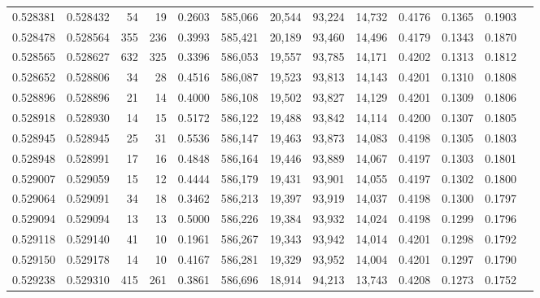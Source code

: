 \begin{tabular}{rrrrrrrrrrrrr}
0.528381 & 0.528432 &    54 &    19 &                                     0.2603 & 585,066 &  20,544 &  93,224 &  14,732 & 0.4176 & 0.1365 & 0.1903 \\
0.528478 & 0.528564 &   355 &   236 &                                     0.3993 & 585,421 &  20,189 &  93,460 &  14,496 & 0.4179 & 0.1343 & 0.1870 \\
0.528565 & 0.528627 &   632 &   325 &                                     0.3396 & 586,053 &  19,557 &  93,785 &  14,171 & 0.4202 & 0.1313 & 0.1812 \\
0.528652 & 0.528806 &    34 &    28 &                                     0.4516 & 586,087 &  19,523 &  93,813 &  14,143 & 0.4201 & 0.1310 & 0.1808 \\
0.528896 & 0.528896 &    21 &    14 &                                     0.4000 & 586,108 &  19,502 &  93,827 &  14,129 & 0.4201 & 0.1309 & 0.1806 \\
0.528918 & 0.528930 &    14 &    15 &                                     0.5172 & 586,122 &  19,488 &  93,842 &  14,114 & 0.4200 & 0.1307 & 0.1805 \\
0.528945 & 0.528945 &    25 &    31 &                                     0.5536 & 586,147 &  19,463 &  93,873 &  14,083 & 0.4198 & 0.1305 & 0.1803 \\
0.528948 & 0.528991 &    17 &    16 &                                     0.4848 & 586,164 &  19,446 &  93,889 &  14,067 & 0.4197 & 0.1303 & 0.1801 \\
0.529007 & 0.529059 &    15 &    12 &                                     0.4444 & 586,179 &  19,431 &  93,901 &  14,055 & 0.4197 & 0.1302 & 0.1800 \\
0.529064 & 0.529091 &    34 &    18 &                                     0.3462 & 586,213 &  19,397 &  93,919 &  14,037 & 0.4198 & 0.1300 & 0.1797 \\
0.529094 & 0.529094 &    13 &    13 &                                     0.5000 & 586,226 &  19,384 &  93,932 &  14,024 & 0.4198 & 0.1299 & 0.1796 \\
0.529118 & 0.529140 &    41 &    10 &                                     0.1961 & 586,267 &  19,343 &  93,942 &  14,014 & 0.4201 & 0.1298 & 0.1792 \\
0.529150 & 0.529178 &    14 &    10 &                                     0.4167 & 586,281 &  19,329 &  93,952 &  14,004 & 0.4201 & 0.1297 & 0.1790 \\
0.529238 & 0.529310 &   415 &   261 &                                     0.3861 & 586,696 &  18,914 &  94,213 &  13,743 & 0.4208 & 0.1273 & 0.1752 \\

\end{tabular}
